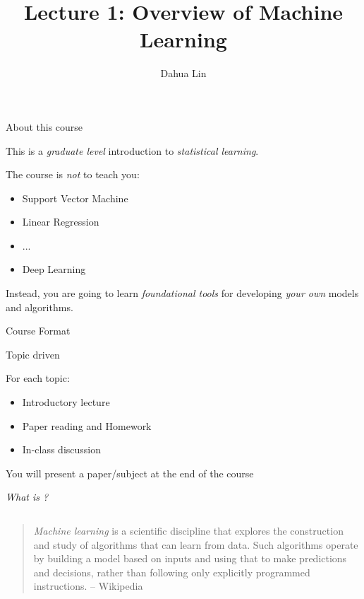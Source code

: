 \documentclass{beamer}
\newenvironment{witemize}{\itemize\addtolength{\itemsep}{15pt}}{\enditemize}
\begin{document}

\title{Lecture 1: Overview of Machine Learning}
\author{Dahua Lin}
\date{}
\frame{\titlepage}



\begin{frame}{About this course}

\begin{witemize}
    \item This is a \emph{graduate level} introduction to \emph{statistical learning}. 
    \item The course is \emph{not} to teach you:
    \begin{itemize}
        \item Support Vector Machine
        \item Linear Regression
        \item ...
        \item Deep Learning
    \end{itemize}
    \item Instead, you are going to learn \emph{foundational tools} for developing \emph{your own} models and algorithms.
\end{witemize}
\end{frame}




\begin{frame}{Course Format}

\begin{witemize}
    \item {}
    \item Topic driven
    \item For each topic:
    \begin{itemize}
        \item Introductory lecture
        \item Paper reading and Homework
        \item In-class discussion
    \end{itemize}
    \item You will present a paper/subject at the end of the course
\end{witemize}
\end{frame}




\begin{frame}{}

{\Large \em What is ?}

$ $
\pause

\begin{quote}
    \emph{Machine learning} is a scientific discipline that explores the construction and study 
    of algorithms that can learn from data. Such algorithms operate by building a model based on 
    inputs and using that to make predictions and decisions, rather than following only explicitly 
    programmed instructions.   -- Wikipedia
\end{quote}
\end{frame}
\end{document}

